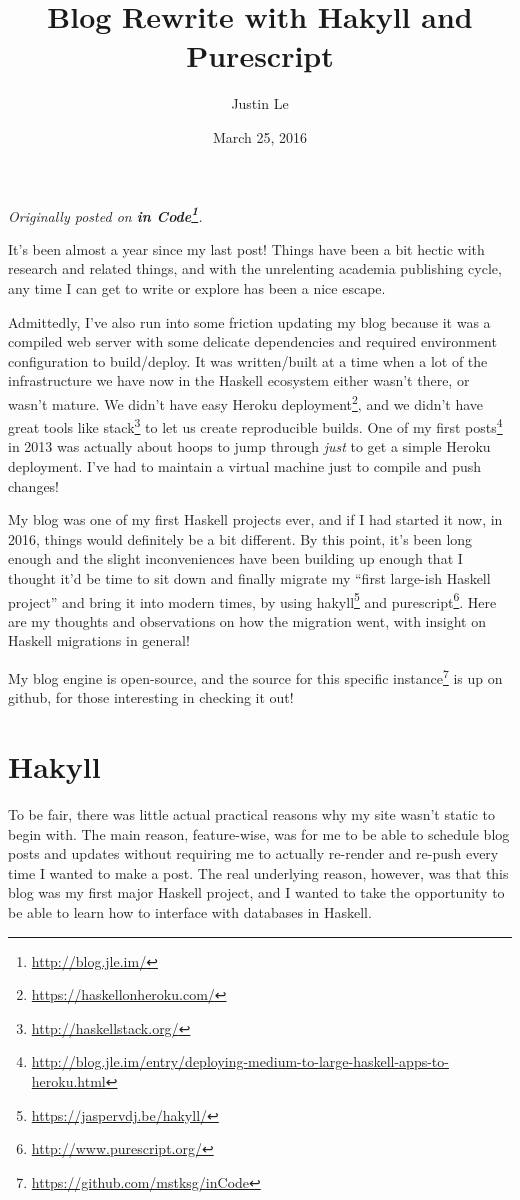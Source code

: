 \documentclass[]{article}
\title{Blog Rewrite with Hakyll and Purescript}
\author{Justin Le}
\date{March 25, 2016}
\renewcommand{\href}[2]{#2\footnote{\url{#1}}}
\begin{document}
\maketitle

\emph{Originally posted on \textbf{\href{http://blog.jle.im/}{in
Code}}.}

It's been almost a year since my last post! Things have been a bit
hectic with research and related things, and with the unrelenting
academia publishing cycle, any time I can get to write or explore has
been a nice escape.

Admittedly, I've also run into some friction updating my blog because it
was a compiled web server with some delicate dependencies and required
environment configuration to build/deploy. It was written/built at a
time when a lot of the infrastructure we have now in the Haskell
ecosystem either wasn't there, or wasn't mature. We didn't have easy
\href{https://haskellonheroku.com/}{Heroku deployment}, and we didn't
have great tools like \href{http://haskellstack.org/}{stack} to let us
create reproducible builds. One of my
\href{http://blog.jle.im/entry/deploying-medium-to-large-haskell-apps-to-heroku.html}{first
posts} in 2013 was actually about hoops to jump through \emph{just} to
get a simple Heroku deployment. I've had to maintain a virtual machine
just to compile and push changes!

My blog was one of my first Haskell projects ever, and if I had started
it now, in 2016, things would definitely be a bit different. By this
point, it's been long enough and the slight inconveniences have been
building up enough that I thought it'd be time to sit down and finally
migrate my ``first large-ish Haskell project'' and bring it into modern
times, by using \href{https://jaspervdj.be/hakyll/}{hakyll} and
\href{http://www.purescript.org/}{purescript}. Here are my thoughts and
observations on how the migration went, with insight on Haskell
migrations in general!

My blog engine is open-source, and the
\href{https://github.com/mstksg/inCode}{source for this specific
instance} is up on github, for those interesting in checking it out!

\section{Hakyll}\label{hakyll}

To be fair, there was little actual practical reasons why my site wasn't
static to begin with. The main reason, feature-wise, was for me to be
able to schedule blog posts and updates without requiring me to actually
re-render and re-push every time I wanted to make a post. The real
underlying reason, however, was that this blog was my first major
Haskell project, and I wanted to take the opportunity to be able to
learn how to interface with databases in Haskell.
\end{document}
